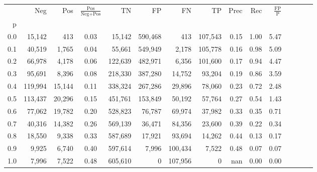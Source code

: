 \begin{tabular}{rrrcrrrrrrrrrrr}
\toprule
{} &      Neg &     Pos & $\frac{\text{Pos}}{\text{Neg}+\text{Pos}}$ &       TN &       FP &       FN &       TP &  Prec &   Rec & $\frac{\text{FP}}{\text{P}}$ \\
p   &          &         &                                            &          &          &          &          &       &       &                              \\
\midrule
0.0 &   15,142 &     413 &                                       0.03 &   15,142 &  590,468 &      413 &  107,543 &  0.15 &  1.00 &                         5.47 \\
0.1 &   40,519 &   1,765 &                                       0.04 &   55,661 &  549,949 &    2,178 &  105,778 &  0.16 &  0.98 &                         5.09 \\
0.2 &   66,978 &   4,178 &                                       0.06 &  122,639 &  482,971 &    6,356 &  101,600 &  0.17 &  0.94 &                         4.47 \\
0.3 &   95,691 &   8,396 &                                       0.08 &  218,330 &  387,280 &   14,752 &   93,204 &  0.19 &  0.86 &                         3.59 \\
0.4 &  119,994 &  15,144 &                                       0.11 &  338,324 &  267,286 &   29,896 &   78,060 &  0.23 &  0.72 &                         2.48 \\
0.5 &  113,437 &  20,296 &                                       0.15 &  451,761 &  153,849 &   50,192 &   57,764 &  0.27 &  0.54 &                         1.43 \\
0.6 &   77,062 &  19,782 &                                       0.20 &  528,823 &   76,787 &   69,974 &   37,982 &  0.33 &  0.35 &                         0.71 \\
0.7 &   40,316 &  14,382 &                                       0.26 &  569,139 &   36,471 &   84,356 &   23,600 &  0.39 &  0.22 &                         0.34 \\
0.8 &   18,550 &   9,338 &                                       0.33 &  587,689 &   17,921 &   93,694 &   14,262 &  0.44 &  0.13 &                         0.17 \\
0.9 &    9,925 &   6,740 &                                       0.40 &  597,614 &    7,996 &  100,434 &    7,522 &  0.48 &  0.07 &                         0.07 \\
1.0 &    7,996 &   7,522 &                                       0.48 &  605,610 &        0 &  107,956 &        0 &   nan &  0.00 &                         0.00 \\
\bottomrule
\end{tabular}

